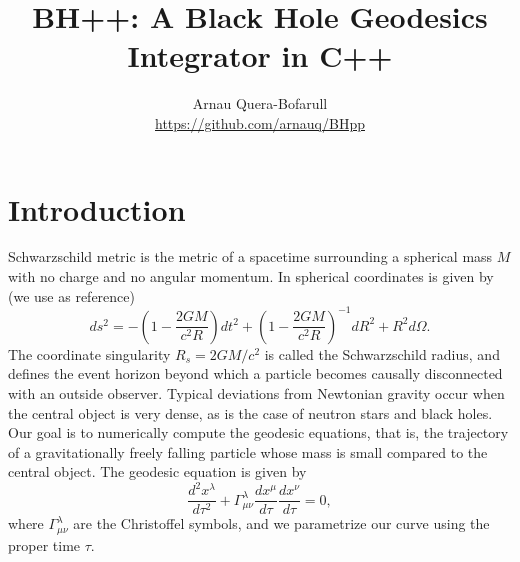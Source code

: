 \documentclass[journal, a4paper]{IEEEtran}
\begin{document}
	\title{ BH++: A Black Hole Geodesics Integrator in C++}
	\author{Arnau Quera-Bofarull \\
	\url{https://github.com/arnauq/BHpp}}
	\maketitle

\section{Introduction}
 Schwarzschild metric is the metric of a spacetime surrounding a spherical mass $M$ with no charge and no angular momentum. In spherical coordinates is given by (we use \cite{WALD} as reference)
	\begin{equation}
		ds^2 = - \left( 1 - \frac{2GM}{c^2 R} \right) dt^2 + \left( 1- \frac{2GM}{c^2 R} \right)^{-1} dR^2 + R^2 d\Omega.
	\end{equation}
The coordinate singularity $R_s = 2GM/c^2$ is called the Schwarzschild radius, and defines the event horizon beyond which a particle becomes causally disconnected with an outside observer. Typical deviations from Newtonian gravity occur when the central object is very dense, as is the case of neutron stars and black holes. Our goal is to numerically compute the geodesic equations, that is, the trajectory of a gravitationally freely falling particle whose mass is small compared to the central object. The geodesic equation is given by
\begin{equation}
	\frac{d^2 x^\lambda}{d \tau^2} + \Gamma_{ \mu \nu }^{ \lambda} \frac{d x^{\mu}}{d \tau} \frac{d x^{\nu}}{d \tau} = 0,
\end{equation}
where $\Gamma_{ \mu \nu }^{ \lambda}$ are the Christoffel symbols, and we parametrize our curve using the proper time $ \tau $.
\end{document}
